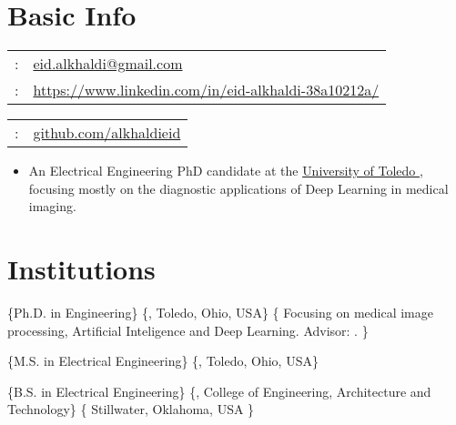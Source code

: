 \documentclass[letterpaper,10pt]{article}
\author{Eid Alkhaldi}
\date{}
\title{}
\begin{document}
\maketitle
\chapter{Basic Info}
\label{sec:org6c7ebfe}

\begin{minipage}[t]{.5\linewidth}
\begin{tabular}{rp{.75\linewidth}}
	\baselineskip=20pt
	\email{} :	& \href{mailto:eid.alkhaldi@gmail.com}{eid.alkhaldi@gmail.com}\\
	\yt{} : & \href{https://www.linkedin.com/in/eid-alkhaldi-38a10212a/}{https://www.linkedin.com/in/eid-alkhaldi-38a10212a/}
\end{tabular}
\end{minipage}
\begin{minipage}[t]{.5\linewidth}
\begin{tabular}{rl}
	\gh{} : & \href{http://github.com/alkhaldieid}{github.com/alkhaldieid}\\

\end{tabular}
\end{minipage}

\begin{itemize}
\item  An Electrical Engineering PhD candidate at the \href{https://www.utoledo.edu/engineering/electrical-engineering-computer-science/}{University of Toledo \www}, focusing mostly on the diagnostic applications of Deep Learning in medical imaging.

\end{itemize}

\chapter{Institutions}
\label{sec:org6946daf}

	\{Ph.D. in Engineering\}
	\{\ut, Toledo, Ohio, USA\}
	\{
	Focusing on medical image processing, Artificial Inteligence and Deep Learning. Advisor: \ezz.
	\}

	\{M.S. in Electrical Engineering\}
	\{\ut, Toledo, Ohio, USA\}

	\{B.S. in Electrical Engineering\}
	\{\osu, College of Engineering, Architecture and Technology\}
	\{
	Stillwater, Oklahoma, USA
	\}
\end{document}
